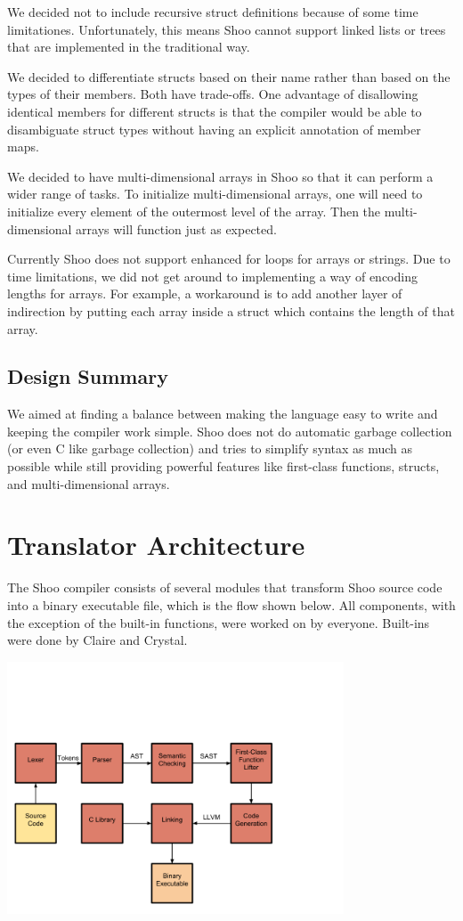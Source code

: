 \documentclass[12pt]{article}
\begin{document}
We decided not to include recursive struct definitions because of some time limitationes. Unfortunately, this means Shoo cannot support linked lists or trees that are implemented in the traditional way.

We decided to differentiate structs based on their name rather than based on the types of their members. Both have trade-offs. One advantage of disallowing identical members for different structs is that the compiler would be able to disambiguate struct types without having an explicit annotation of member maps.

We decided to have multi-dimensional arrays in Shoo so that it can perform a wider range of tasks. To initialize multi-dimensional arrays, one will need to initialize every element of the outermost level of the array. Then the multi-dimensional arrays will function just as expected.

Currently Shoo does not support enhanced for loops for arrays or strings. Due to time limitations, we did not get around to implementing a way of encoding lengths for arrays. For example, a workaround is to add another layer of indirection by putting each array inside a struct which contains the length of that array. 

\subsection{Design Summary}
We aimed at finding a balance between making the language easy to write and keeping the compiler work simple. Shoo does not do automatic garbage collection (or even C like garbage collection) and tries to simplify syntax as much as possible while still providing powerful features like first-class functions, structs, and multi-dimensional arrays.

\section{Translator Architecture}
The Shoo compiler consists of several modules that transform Shoo source code into a binary executable file, which is the flow shown below. All components, with the exception of the built-in functions, were worked on by everyone. Built-ins were done by Claire and Crystal.

\includegraphics[width=100mm,scale=0.5]{design.png}
\end{document}
